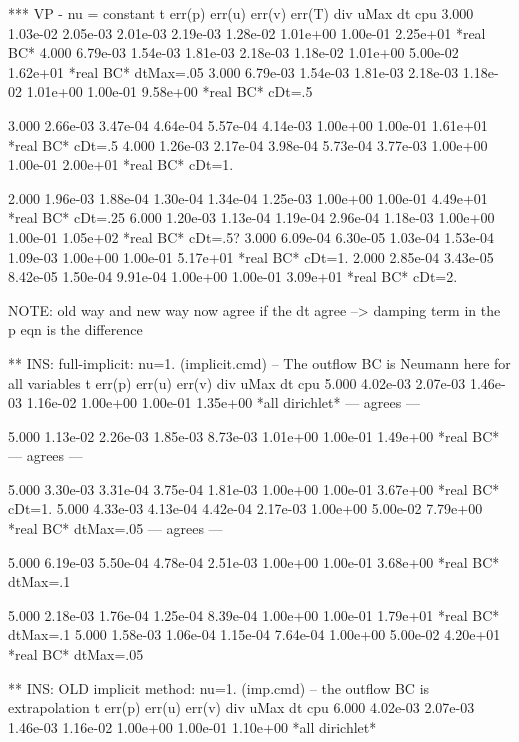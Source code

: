 {*** VP - nu = constant
     t    err(p)   err(u)   err(v)   err(T)    div       uMax     dt       cpu
   3.000 1.03e-02 2.05e-03 2.01e-03 2.19e-03 1.28e-02  1.01e+00 1.00e-01 2.25e+01  *real BC*
   4.000 6.79e-03 1.54e-03 1.81e-03 2.18e-03 1.18e-02  1.01e+00 5.00e-02 1.62e+01  *real BC* dtMax=.05
   3.000 6.79e-03 1.54e-03 1.81e-03 2.18e-03 1.18e-02  1.01e+00 1.00e-01 9.58e+00  *real BC* cDt=.5 

   3.000 2.66e-03 3.47e-04 4.64e-04 5.57e-04 4.14e-03  1.00e+00 1.00e-01 1.61e+01 *real BC* cDt=.5 
   4.000 1.26e-03 2.17e-04 3.98e-04 5.73e-04 3.77e-03  1.00e+00 1.00e-01 2.00e+01 *real BC* cDt=1.

   2.000 1.96e-03 1.88e-04 1.30e-04 1.34e-04 1.25e-03  1.00e+00 1.00e-01 4.49e+01 *real BC* cDt=.25
   6.000 1.20e-03 1.13e-04 1.19e-04 2.96e-04 1.18e-03  1.00e+00 1.00e-01 1.05e+02 *real BC* cDt=.5?
   3.000 6.09e-04 6.30e-05 1.03e-04 1.53e-04 1.09e-03  1.00e+00 1.00e-01 5.17e+01 *real BC* cDt=1.
   2.000 2.85e-04 3.43e-05 8.42e-05 1.50e-04 9.91e-04  1.00e+00 1.00e-01 3.09e+01 *real BC* cDt=2.

NOTE: old way and new way now agree if the dt agree --> damping term in the p eqn is the difference

** INS: full-implicit: nu=1. (implicit.cmd) -- The outflow BC is Neumann here for all variables
     t    err(p)   err(u)   err(v)    div       uMax     dt       cpu
   5.000 4.02e-03 2.07e-03 1.46e-03 1.16e-02  1.00e+00 1.00e-01 1.35e+00  *all dirichlet*  --- agrees ---

   5.000 1.13e-02 2.26e-03 1.85e-03 8.73e-03  1.01e+00 1.00e-01 1.49e+00  *real BC* --- agrees ---

   5.000 3.30e-03 3.31e-04 3.75e-04 1.81e-03  1.00e+00 1.00e-01 3.67e+00 *real BC* cDt=1. 
   5.000 4.33e-03 4.13e-04 4.42e-04 2.17e-03  1.00e+00 5.00e-02 7.79e+00 *real BC* dtMax=.05 --- agrees ---
 
   5.000 6.19e-03 5.50e-04 4.78e-04 2.51e-03  1.00e+00 1.00e-01 3.68e+00 *real BC* dtMax=.1

   5.000 2.18e-03 1.76e-04 1.25e-04 8.39e-04  1.00e+00 1.00e-01 1.79e+01  *real BC* dtMax=.1
   5.000 1.58e-03 1.06e-04 1.15e-04 7.64e-04  1.00e+00 5.00e-02 4.20e+01  *real BC* dtMax=.05


** INS: OLD implicit method: nu=1. (imp.cmd)  -- the outflow BC is extrapolation
     t    err(p)   err(u)   err(v)    div       uMax     dt       cpu
   6.000 4.02e-03 2.07e-03 1.46e-03 1.16e-02  1.00e+00 1.00e-01 1.10e+00  *all dirichlet*

}
